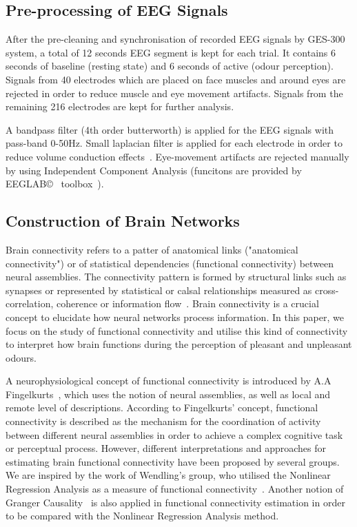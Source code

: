 \documentclass[conference]{IEEEtran}
\begin{document}
\subsection{Pre-processing of EEG Signals}
After the pre-cleaning and synchronisation of recorded EEG signals by GES-300 system, a total of 12 seconds EEG segment is kept for each trial. It contains 6 seconds of baseline (resting state) and 6 seconds of active (odour perception). Signals from 40 electrodes which are placed on face muscles and around eyes are rejected in order to reduce muscle and eye movement artifacts. Signals from the remaining 216 electrodes are kept for further analysis. 

A bandpass filter (4th order butterworth) is applied for the EEG signals with pass-band 0-50Hz. Small laplacian filter is applied for each electrode in order to reduce volume conduction effects~\cite{wolters2007volume}. Eye-movement artifacts are rejected manually by using Independent Component Analysis (funcitons are provided by EEGLAB\copyright~ toolbox~\cite{luck2014introduction}). 

\subsection{Construction of Brain Networks}
Brain connectivity refers to a patter of anatomical links ("anatomical connectivity") or of statistical dependencies (functional connectivity) between neural assemblies. The connectivity pattern is formed by structural links such as synapses or represented by statistical or calsal relationships measured as cross-correlation, coherence or information flow~\cite{sporns2007brain}. Brain connectivity is a crucial concept to elucidate how neural networks process information. In this paper, we focus on the study of functional connectivity and utilise this kind of connectivity to interpret how brain functions during the perception of pleasant and unpleasant odours. 

A neurophysiological concept of functional connectivity is introduced by A.A Fingelkurts~\cite{fingelkurts2005functional}, which uses the notion of neural assemblies, as well as local and remote level of descriptions. According to Fingelkurts' concept, functional connectivity is described as the mechanism for the coordination of activity between different neural assemblies in order to achieve a complex cognitive task or perceptual process. However, different interpretations and approaches for estimating brain functional connectivity have been proposed by several groups. We are inspired by the work of Wendling's group, who utilised the Nonlinear Regression Analysis as a measure of functional connectivity~\cite{bettus2008enhanced}. Another notion of Granger Causality~\cite{roebroeck2005mapping} is also applied in functional connectivity estimation in order to be compared with the Nonlinear Regression Analysis method. 
\end{document}
